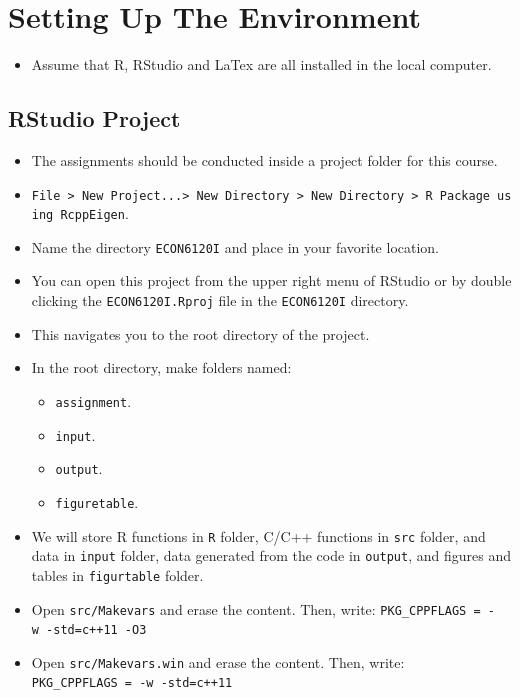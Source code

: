 \documentclass[]{book}
\providecommand{\tightlist}{%
  \setlength{\itemsep}{0pt}\setlength{\parskip}{0pt}}
\theoremstyle{definition}
\theoremstyle{definition}
\theoremstyle{definition}
\theoremstyle{remark}
\begin{document}
\section{Setting Up The Environment}\label{setting-up-the-environment}

\begin{itemize}
\tightlist
\item
  Assume that R, RStudio and LaTex are all installed in the local
  computer.
\end{itemize}

\subsection{RStudio Project}\label{rstudio-project}

\begin{itemize}
\tightlist
\item
  The assignments should be conducted inside a project folder for this
  course.
\item
  \texttt{File\ \textgreater{}\ New\ Project...\textgreater{}\ New\ Directory\ \textgreater{}\ New\ Directory\ \textgreater{}\ R\ Package\ using\ RcppEigen}.
\item
  Name the directory \texttt{ECON6120I} and place in your favorite
  location.
\item
  You can open this project from the upper right menu of RStudio or by
  double clicking the \texttt{ECON6120I.Rproj} file in the
  \texttt{ECON6120I} directory.
\item
  This navigates you to the root directory of the project.
\item
  In the root directory, make folders named:

  \begin{itemize}
  \tightlist
  \item
    \texttt{assignment}.
  \item
    \texttt{input}.
  \item
    \texttt{output}.
  \item
    \texttt{figuretable}.
  \end{itemize}
\item
  We will store R functions in \texttt{R} folder, C/C++ functions in
  \texttt{src} folder, and data in \texttt{input} folder, data generated
  from the code in \texttt{output}, and figures and tables in
  \texttt{figurtable} folder.
\item
  Open \texttt{src/Makevars} and erase the content. Then, write:
  \texttt{PKG\_CPPFLAGS\ =\ -w\ -std=c++11\ -O3}
\item
  Open \texttt{src/Makevars.win} and erase the content. Then, write:
  \texttt{PKG\_CPPFLAGS\ =\ -w\ -std=c++11}
\end{itemize}
\end{document}
